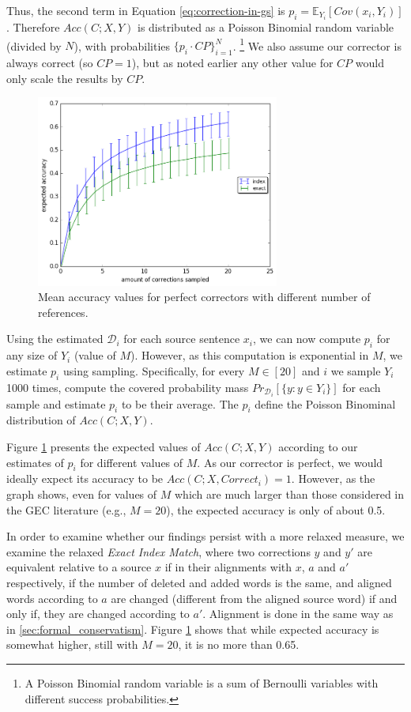 \documentclass[letter,11pt]{article}
\begin{document}
		Thus, the second
		term in Equation \ref{eq:correction-in-gs} is $p_i = \mathbb{E}_{Y_i}[Cov(x_i,Y_i)]$. Therefore $Acc(C;X,Y)$ is distributed as
		a Poisson Binomial random variable (divided by $N$), with probabilities $\{p_i \cdot CP\}_{i=1}^N$. \footnote{A Poisson Binomial random variable is a sum of Bernoulli variables with different success probabilities.} We also assume our corrector is always correct (so $CP=1$), but as noted earlier any other value for $CP$ would only scale the results by $CP$.
		
		\begin{figure}
			\includegraphics[width=8cm]{repeat_1000_accuracy}
			\caption{Mean accuracy values for perfect correctors with different number of references.} \label{fig:accuracy_vals}
		\end{figure}
		
		Using the estimated $\mathcal{D}_i$ for each source sentence $x_i$, we can now compute $p_i$ for any
		size of $Y_i$ (value of $M$). However, as this computation is exponential in $M$, we estimate $p_i$ using
		sampling. Specifically, for every $M\in[20]$ and $i$ we sample $Y_i$ 1000 times, compute 
		the covered probability mass $Pr_{\mathcal{D}_i}[\{y: y \in Y_i\}]$ for each sample and estimate $p_i$ to be their
		average. The $p_i$ define the Poisson Binominal distribution of $Acc(C;X,Y)$.
		
		Figure \ref{fig:accuracy_vals} presents the expected values of $Acc(C;X,Y)$ according to our estimates of $p_i$ for
		different values of $M$. As our corrector is perfect, we would ideally expect its accuracy to be
		$Acc(C;X,Correct_i) = 1$. However, as the graph shows, even for values of $M$ which are much larger than
		those considered in the GEC literature (e.g., $M=20$), the expected accuracy is only of about 0.5.
		
		In order to examine whether our findings persist with a more relaxed measure, we examine the relaxed
		{\it Exact Index Match}, where two corrections $y$ and $y'$
		are equivalent relative to a source $x$ if in their alignments with $x$, $a$ and $a'$ respectively,
		if the number of deleted and added words is the same, and aligned words according to $a$ are
		changed (different from the aligned source word) if and only if, they are changed according to $a'$. Alignment is done in the same way as in \ref{sec:formal_conservatism}. Figure \ref{fig:accuracy_vals}
		shows that while expected accuracy is somewhat higher, still with $M=20$, it is no more than 0.65.
		
\end{document}

